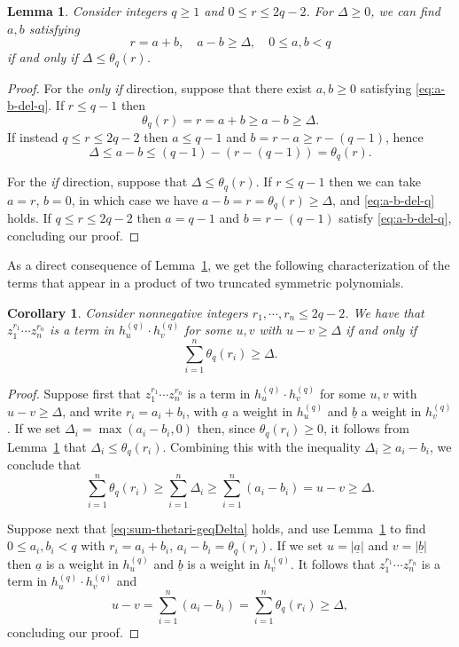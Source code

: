 \documentclass[11pt,reqno]{amsart}
\newcommand{\ul}[1]{\underline{#1}}
\newtheorem{lemma}[theorem]{Lemma}
\newtheorem{corollary}[theorem]{Corollary}
\theoremstyle{definition}
\theoremstyle{remark}
\numberwithin{equation}{section}
\begin{document}
\begin{lemma}\label{lem:thetaq-meaning}
    Consider integers $q\geq 1$ and $0\leq r\leq 2q-2$. For $\Delta\geq 0$, we can find $a,b$ satisfying
    \begin{equation}\label{eq:a-b-del-q} 
    r = a+b,\quad a-b \geq \Delta,\quad 0\leq a,b<q
    \end{equation}
    if and only if $\Delta \leq \theta_q(r)$.
\end{lemma}

\begin{proof}
    For the \emph{only if} direction, suppose that there exist $a,b\geq 0$ satisfying \eqref{eq:a-b-del-q}. If $r\leq q-1$ then 
    \[ \theta_q(r) = r = a+b \geq a-b \geq \Delta.\]
    If instead $q\leq r \leq 2q-2$ then $a\leq q-1$ and $b=r-a \geq r-(q-1)$, hence
    \[ \Delta \leq a-b \leq (q-1) - (r-(q-1)) = \theta_q(r).\]

    For the \emph{if} direction, suppose that $\Delta\leq\theta_q(r)$. If $r\leq q-1$ then we can take $a=r$, $b=0$, in which case we have $a-b=r=\theta_q(r)\geq\Delta$, and \eqref{eq:a-b-del-q} holds. If $q\leq r\leq 2q-2$ then $a=q-1$ and $b=r-(q-1)$ satisfy \eqref{eq:a-b-del-q}, concluding our proof.
\end{proof}

As a direct consequence of Lemma~\ref{lem:thetaq-meaning}, we get the following characterization of the terms that appear in a product of two truncated symmetric polynomials.

\begin{corollary}\label{cor:terms-in-hqu-hqv}
    Consider nonnegative integers $r_1,\cdots,r_n\leq 2q-2$. We have that $z_1^{r_1}\cdots z_n^{r_n}$ is a term in $h_u^{(q)}\cdot h_v^{(q)}$ for some $u,v$ with $u-v\geq\Delta$ if and only if
    \begin{equation}\label{eq:sum-thetari-geqDelta} 
    \sum_{i=1}^n \theta_q(r_i) \geq \Delta.
    \end{equation}
\end{corollary}

\begin{proof}
    Suppose first that $z_1^{r_1}\cdots z_n^{r_n}$ is a term in $h_u^{(q)}\cdot h_v^{(q)}$ for some $u,v$ with $u-v\geq\Delta$, and write $r_i=a_i+b_i$, with $\ul{a}$ a weight in $h_u^{(q)}$ and $\ul{b}$ a weight in $h_v^{(q)}$. If we set $\Delta_i = \max(a_i-b_i,0)$ then, since $\theta_q(r_i)\geq 0$, it follows from Lemma~\ref{lem:thetaq-meaning} that $\Delta_i\leq\theta_q(r_i)$. Combining this with the inequality $\Delta_i\geq a_i-b_i$, we conclude that
    \[\sum_{i=1}^n \theta_q(r_i) \geq \sum_{i=1}^n \Delta_i \geq \sum_{i=1}^n(a_i-b_i) = u-v \geq \Delta.\]

    Suppose next that \eqref{eq:sum-thetari-geqDelta} holds, and use Lemma~\ref{lem:thetaq-meaning} to find $0\leq a_i,b_i<q$ with $r_i=a_i+b_i$, $a_i-b_i = \theta_q(r_i)$. If we set $u=|\ul{a}|$ and $v=|\ul{b}|$ then $\ul{a}$ is a weight in $h_u^{(q)}$ and $\ul{b}$ is a weight in $h_v^{(q)}$. It follows that $z_1^{r_1}\cdots z_n^{r_n}$ is a term in $h_u^{(q)}\cdot h_v^{(q)}$ and
    \[u-v = \sum_{i=1}^n(a_i-b_i) = \sum_{i=1}^n \theta_q(r_i) \geq \Delta,\]
    concluding our proof.
\end{proof}
\end{document}
